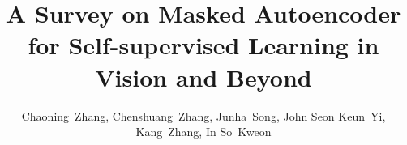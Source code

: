 \documentclass[10pt,journal,compsoc]{IEEEtran}
\begin{document}
%

\title{A Survey on Masked Autoencoder for Self-supervised Learning in Vision and Beyond}



\author{Chaoning~Zhang, Chenshuang~Zhang, Junha~Song, John Seon Keun~Yi, Kang~Zhang, In So~Kweon%
}

% 
%
\end{document}

